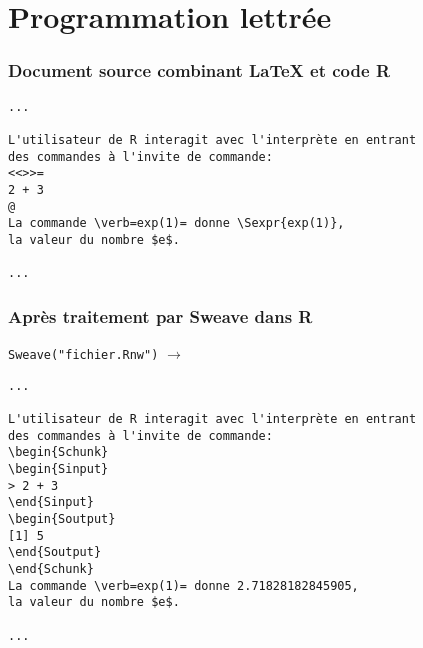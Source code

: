 \section{Programmation lettrée}

\begin{frame}[fragile=singleslide]
  \frametitle{Document source combinant {\LaTeX} et code R}

\begin{lstlisting}[emph={Sexpr}]
...

L'utilisateur de R interagit avec l'interprète en entrant
des commandes à l'invite de commande:
<<>>=
2 + 3
@
La commande \verb=exp(1)= donne \Sexpr{exp(1)},
la valeur du nombre $e$.

...
\end{lstlisting}
\end{frame}

\begin{frame}[fragile=singleslide]
  \frametitle{Après traitement par Sweave dans R}

  \texttt{Sweave("fichier.Rnw")}
  $\rightarrow$ 
\begin{lstlisting}[emph={Schunk,Sinput,Soutput}]
...

L'utilisateur de R interagit avec l'interprète en entrant
des commandes à l'invite de commande:
\begin{Schunk}
\begin{Sinput}
> 2 + 3
\end{Sinput}
\begin{Soutput}
[1] 5
\end{Soutput}
\end{Schunk}
La commande \verb=exp(1)= donne 2.71828182845905,
la valeur du nombre $e$.

...
\end{lstlisting}

\end{frame}

